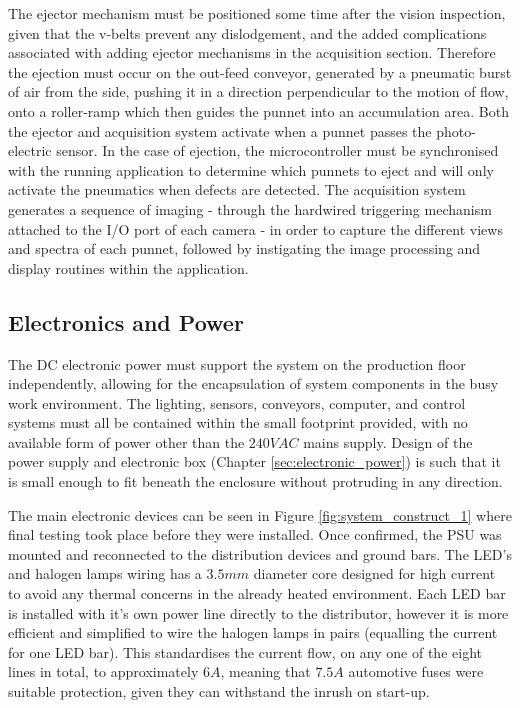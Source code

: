\documentclass[fleqn,twoside,12pt]{report}
\begin{document}
The ejector mechanism must be positioned some time after the vision inspection, given that the v-belts prevent any dislodgement, and the added complications associated with adding ejector mechanisms in the acquisition section. Therefore the ejection must occur on the out-feed conveyor, generated by a pneumatic burst of air from the side, pushing it in a direction perpendicular to the motion of flow, onto a roller-ramp which then guides the punnet into an accumulation area. Both the ejector and acquisition system activate when a punnet passes the photo-electric sensor. In the case of ejection, the microcontroller must be synchronised with the running application to determine which punnets to eject and will only activate the pneumatics when defects are detected. The acquisition system generates a sequence of imaging - through the hardwired triggering mechanism attached to the I/O port of each camera - in order to capture the different views and spectra of each punnet, followed by instigating the image processing and display routines within the application. 


\subsection{Electronics and Power}

The DC electronic power must support the system on the production floor independently, allowing for the encapsulation of system components in the busy work environment. The lighting, sensors, conveyors, computer, and control systems must all be contained within the small footprint provided, with no available form of power other than the $240VAC$ mains supply. Design of the power supply and electronic box (Chapter \ref{sec:electronic_power}) is such that it is small enough to fit beneath the enclosure without protruding in any direction. 


The main electronic devices can be seen in Figure \ref{fig:system_construct_1} where final testing took place before they were installed. Once confirmed, the PSU was mounted and reconnected to the distribution devices and ground bars. The LED's and halogen lamps wiring has a $3.5mm$ diameter core designed for high current to avoid any thermal concerns in the already heated environment. Each LED bar is installed with it's own power line directly to the distributor, however it is more efficient and simplified to wire the halogen lamps in pairs (equalling the current for one LED bar). This standardises the current flow, on any one of the eight lines in total, to approximately $6A$, meaning that $7.5A$ automotive fuses were suitable protection, given they can withstand the inrush on start-up. 
\end{document}
